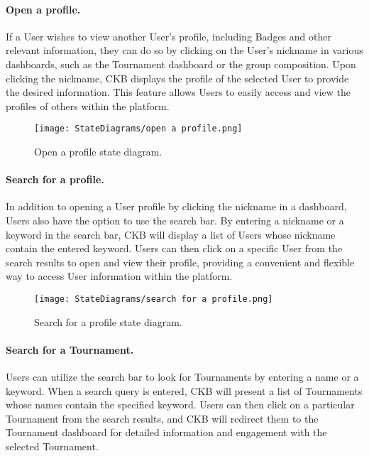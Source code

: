 \paragraph{Open a profile.}
If a User wishes to view another User's profile, including Badges and other relevant information, they can do so by clicking on the User's nickname in various dashboards, such as the Tournament dashboard or the group composition. Upon clicking the nickname, CKB displays the profile of the selected User to provide the desired information. This feature allows Users to easily access and view the profiles of others within the platform.

\begin{figure}[H]
    \begin{center}
        \texttt{[image: StateDiagrams/open a profile.png]}
        \caption{Open a profile state diagram.}
        \label{fig:open_profile_sd}%
    \end{center}
\end{figure}

\paragraph{Search for a profile.}
In addition to opening a User profile by clicking the nickname in a dashboard, Users also have the option to use the search bar. By entering a nickname or a keyword in the search bar, CKB will display a list of Users whose nickname contain the entered keyword. Users can then click on a specific User from the search results to open and view their profile, providing a convenient and flexible way to access User information within the platform.

\begin{figure}[H]
    \begin{center}
        \texttt{[image: StateDiagrams/search for a profile.png]}
        \caption{Search for a profile state diagram.}
        \label{fig:search_profile_sd}%
    \end{center}
\end{figure}

\paragraph{Search for a Tournament.}
Users can utilize the search bar to look for Tournaments by entering a name or a keyword. When a search query is entered, CKB will present a list of Tournaments whose names contain the specified keyword. Users can then click on a particular Tournament from the search results, and CKB will redirect them to the Tournament dashboard for detailed information and engagement with the selected Tournament. 

